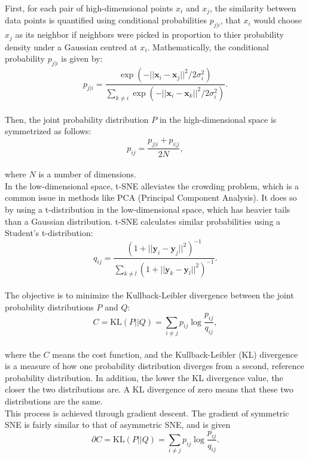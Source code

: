 \documentclass{article}\usepackage[]{graphicx}\usepackage[]{xcolor}
\numberwithin{equation}{section}
\begin{document}
{\noindent
First, for each pair of high-dimensional points $x_i$ and $x_j$, the similarity between data points is quantified using conditional probabilities $p_{j|i}$, that $x_i$ would choose $x_j$ as its neighbor if neighbors were picked in proportion to thier probability density under a Gaussian centred at $x_i$. Mathematically, the conditional probability $p_{j|i}$ is given by:
    \[
        p_{j|i} = \frac{\exp(-||\mathbf{x}_i - \mathbf{x}_j||^2 / 2\sigma_i^2)}{\sum_{k \neq i}\exp(-||\mathbf{x}_i - \mathbf{x}_k||^2 / 2\sigma_i^2)}.
    \] \\

\noindent
Then, the joint probability distribution $P$ in the high-dimensional space is symmetrized as follows:
    \[
        p_{ij} = \frac{p_{j|i} + p_{i|j}}{2N},
    \] \\
\noindent
where $N$ is a number of dimensions.\\

\noindent
In the low-dimensional space, t-SNE alleviates the crowding problem, which is a common issue in methods like PCA (Principal Component Analysis). It does so by using a t-distribution in the low-dimensional space, which has heavier tails than a Gaussian distribution. t-SNE calculates similar probabilities using a Student's t-distribution:
    \[
        q_{ij} = \frac{(1 + ||\mathbf{y}_i - \mathbf{y}_j||^2)^{-1}}{\sum_{k \neq l}(1 + ||\mathbf{y}_k - \mathbf{y}_l||^2)^{-1}}.
    \] \\
    
\noindent
The objective is to minimize the Kullback-Leibler divergence between the joint probability distributions $P$ and $Q$:
    \[
        C = \text{KL}(P || Q) = \sum_{i \neq j} p_{ij} \log \frac{p_{ij}}{q_{ij}},
    \] \\
\noindent
where the $C$ means the cost function, and the Kullback-Leibler (KL) divergence is a measure of how one probability distribution diverges from a second, reference probability distribution. In addition, the lower the KL divergence value, the closer the two distributions are. A KL divergence of zero means that these two distributions are the same.\\

\noindent
This process is achieved through gradient descent. The gradient of symmetric SNE is fairly similar to that of asymmetric SNE, and is given 
\[
        \partial C = \text{KL}(P || Q) = \sum_{i \neq j} p_{ij} \log \frac{p_{ij}}{q_{ij}}.
    \] \\
    
}
\end{document}
